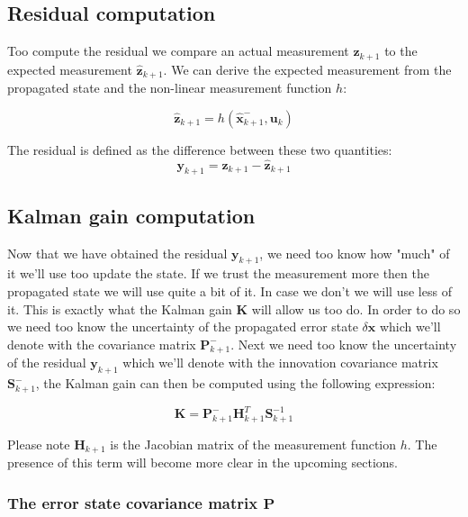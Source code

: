 \documentclass{article}
\begin{document}
	\subsection{Residual computation}
	
	Too compute the residual we compare an actual measurement $\mathbf{z}_{k+1}$ to the expected measurement $\hat{\mathbf{z}}_{k+1}$. We can derive the expected measurement from the propagated state and the non-linear measurement function $h$:
	
	\begin{equation*}
		\hat{\mathbf{z}}_{k+1} = h(\hat{\mathbf{x}}_{k+1}^-, \mathbf{u}_k)
	\end{equation*}
	
	The residual is defined as the difference between these two quantities:
	\begin{equation*}
		\mathbf{y}_{k+1} = \mathbf{z}_{k+1} - \hat{\mathbf{z}}_{k+1}
	\end{equation*}
	
	\subsection{Kalman gain computation}
	Now that we have obtained the residual $\mathbf{y}_{k+1}$, we need too know how "much" of it we'll use too update the state. If we trust the measurement more then the propagated state we will use quite a bit of it. In case we don't we will use less of it. This is exactly what the Kalman gain $\mathbf{K}$ will allow us too do. In order to do so we need too know the uncertainty of the propagated error state $\delta\mathbf{x}$ which we'll denote with the covariance matrix $\mathbf{P}_{k+1}^-$. Next we need too know the uncertainty of the residual $\mathbf{y}_{k+1}$ which we'll denote with the innovation covariance matrix $\mathbf{S}_{k+1}^-$, the Kalman gain can then be computed using the following expression:
	
	\begin{equation*}
		\mathbf{K} = \mathbf{P}_{k+1}^- \mathbf{H}_{k+1}^T \mathbf{S}_{k+1}^{-1}
	\end{equation*}
	
	Please note $\mathbf{H}_{k+1}$ is the Jacobian matrix of the measurement function $h$. The presence of this term will become more clear in the upcoming sections.
	
	\subsubsection{The error state covariance matrix $\mathbf{P}$}
	
\end{document}
